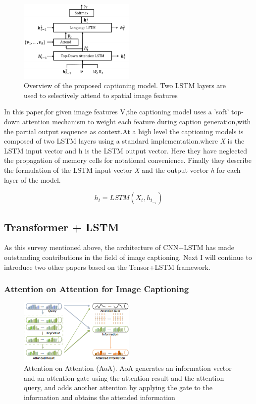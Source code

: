 \documentclass[xelatex,a4j,10pt,twocolumn]{article}
\begin{document}
\begin{figure}[h]
	\centering
    \includegraphics[width=0.5\textwidth]{5.png}
 	\caption{Overview of the proposed captioning model. Two LSTM
layers are used to selectively attend to spatial image features}
 	\label{fig:5}
\end{figure}
In this paper,for given image features V,the captioning model uses a 'soft' top-down attention mechanism to weight each feature during caption generation,with the partial output sequence as context.At a high level the captioning models is composed of two LSTM layers using a standard implementation.where \textit{X} is the LSTM input vector and h is the LSTM output vector. Here they have neglected the propagation of memory cells for notational convenience. Finally they describe the formulation of the LSTM input vector \textit{X} and the output vector \textit{h} for each layer of the model.

\begin{equation}
    h_t = LSTM(X_t,h_t_-_1)
\end{equation}







\subsection{Transformer + LSTM}
As this survey mentioned above, the architecture of CNN+LSTM has made outstanding contributions in the field of image captioning. Next I will continue to introduce two other papers based on the Tensor+LSTM framework.
\subsubsection{Attention on Attention for Image Captioning}
\begin{figure}[h]
	\centering
    \includegraphics[width=0.5\textwidth]{6.png}
 	\caption{Attention on Attention (AoA). AoA generates an
information vector and an attention gate using the attention result and the attention query, and adds another attention by applying the gate to the information and obtains the
attended information}
 	\label{fig:6}
\end{figure}
\end{document}
